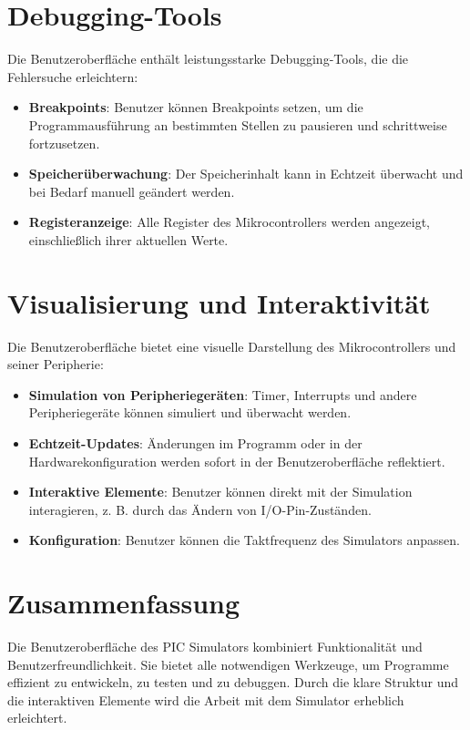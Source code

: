 \section{Debugging-Tools}
Die Benutzeroberfläche enthält leistungsstarke Debugging-Tools, die die Fehlersuche erleichtern:
\begin{itemize}
    \item \textbf{Breakpoints}: Benutzer können Breakpoints setzen, um die Programmausführung an bestimmten Stellen zu pausieren und schrittweise fortzusetzen.
    \item \textbf{Speicherüberwachung}: Der Speicherinhalt kann in Echtzeit überwacht und bei Bedarf manuell geändert werden.
    \item \textbf{Registeranzeige}: Alle Register des Mikrocontrollers werden angezeigt, einschließlich ihrer aktuellen Werte.
\end{itemize}

\section{Visualisierung und Interaktivität}
Die Benutzeroberfläche bietet eine visuelle Darstellung des Mikrocontrollers und seiner Peripherie:
\begin{itemize}
    \item \textbf{Simulation von Peripheriegeräten}: Timer, Interrupts und andere Peripheriegeräte können simuliert und überwacht werden.
    \item \textbf{Echtzeit-Updates}: Änderungen im Programm oder in der Hardwarekonfiguration werden sofort in der Benutzeroberfläche reflektiert.
    \item \textbf{Interaktive Elemente}: Benutzer können direkt mit der Simulation interagieren, z. B. durch das Ändern von I/O-Pin-Zuständen.
    \item \textbf{Konfiguration}: Benutzer können die Taktfrequenz des Simulators anpassen.
\end{itemize}

\section{Zusammenfassung}
Die Benutzeroberfläche des PIC Simulators kombiniert Funktionalität und Benutzerfreundlichkeit. Sie bietet alle notwendigen Werkzeuge, um Programme effizient zu entwickeln, zu testen und zu debuggen. Durch die klare Struktur und die interaktiven Elemente wird die Arbeit mit dem Simulator erheblich erleichtert.







